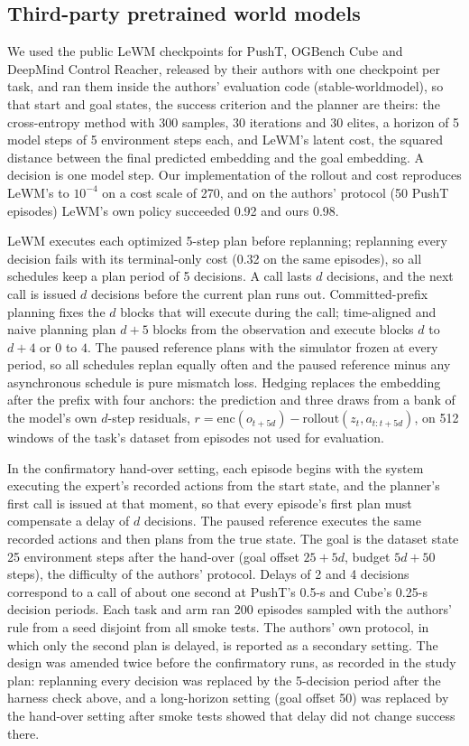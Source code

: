 \documentclass[aps,physrev,\manuscriptlayout,superscriptaddress,
  longbibliography,amsmath,amssymb]{revtex4-2}
\begin{document}
\subsection{Third-party pretrained world models}\label{app:lewm}

We used the public LeWM checkpoints for PushT, OGBench Cube and DeepMind Control Reacher\cite{maes2026lewm}, released by their authors with one checkpoint per task, and ran them inside the authors' evaluation code (stable-worldmodel\cite{maes2026swm}), so that start and goal states, the success criterion and the planner are theirs: the cross-entropy method with 300 samples, 30 iterations and 30 elites, a horizon of 5 model steps of 5 environment steps each, and LeWM's latent cost, the squared distance between the final predicted embedding and the goal embedding. A decision is one model step. Our implementation of the rollout and cost reproduces LeWM's to $10^{-4}$ on a cost scale of 270, and on the authors' protocol (50 PushT episodes) LeWM's own policy succeeded 0.92 and ours 0.98.

LeWM executes each optimized 5-step plan before replanning; replanning every decision fails with its terminal-only cost (0.32 on the same episodes), so all schedules keep a plan period of 5 decisions. A call lasts $d$ decisions, and the next call is issued $d$ decisions before the current plan runs out. Committed-prefix planning fixes the $d$ blocks that will execute during the call; time-aligned and naive planning plan $d+5$ blocks from the observation and execute blocks $d$ to $d+4$ or $0$ to $4$. The paused reference plans with the simulator frozen at every period, so all schedules replan equally often and the paused reference minus any asynchronous schedule is pure mismatch loss. Hedging replaces the embedding after the prefix with four anchors: the prediction and three draws from a bank of the model's own $d$-step residuals, $r=\mathrm{enc}(o_{t+5d})-\mathrm{rollout}(z_t,a_{t:t+5d})$, on 512 windows of the task's dataset from episodes not used for evaluation.

In the confirmatory hand-over setting, each episode begins with the system executing the expert's recorded actions from the start state, and the planner's first call is issued at that moment, so that every episode's first plan must compensate a delay of $d$ decisions. The paused reference executes the same recorded actions and then plans from the true state. The goal is the dataset state 25 environment steps after the hand-over (goal offset $25+5d$, budget $5d+50$ steps), the difficulty of the authors' protocol. Delays of 2 and 4 decisions correspond to a call of about one second at PushT's 0.5-s and Cube's 0.25-s decision periods. Each task and arm ran 200 episodes sampled with the authors' rule from a seed disjoint from all smoke tests. The authors' own protocol, in which only the second plan is delayed, is reported as a secondary setting. The design was amended twice before the confirmatory runs, as recorded in the study plan: replanning every decision was replaced by the 5-decision period after the harness check above, and a long-horizon setting (goal offset 50) was replaced by the hand-over setting after smoke tests showed that delay did not change success there.
\end{document}

